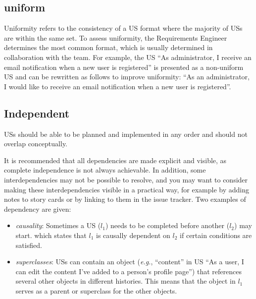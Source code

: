 \subsection*{\normalsize{uniform}}
Uniformity refers to the consistency of a US format where the majority of USs are within the same set. To assess uniformity, the Requirements Engineer determines the most common format, which is usually determined in collaboration with the team. For example, the US \enquote{As administrator, I receive an email notification when a new user is registered} is presented as a non-uniform US and can be rewritten as follows to improve uniformity: \enquote{As an administrator, I would like to receive an email notification when a new user is registered}.
\subsection*{\normalsize{Independent}}
USs should be able to be planned and implemented in any order and should not overlap conceptually. 

It is recommended that all dependencies are made explicit and visible, as complete independence is not always achievable. In addition, some interdependencies may not be possible to resolve, and you may want to consider making these interdependencies visible in a practical way, for example by adding notes to story cards or by linking to them in the issue tracker. Two examples of dependency are given:
\begin{itemize}
\item\emph{causality}: Sometimes a US ($l_1$) needs to be completed before another ($l_2$) may start. which states that $l_1$ is causally dependent on $l_2$ if certain conditions are satisfied.
\item\emph{superclasses}: USs can contain an object (\emph{e.g.}, \enquote{content} in US \enquote{As a user, I can edit the content I've added to a person's profile page}) that references several other objects in different histories. This means that the object in $l_1$ serves as a parent or superclass for the other objects.
\end{itemize}

